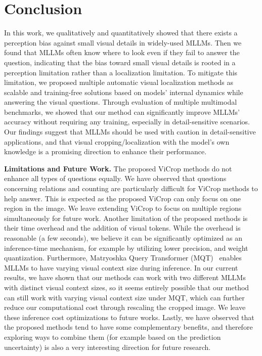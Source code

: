 \section{Conclusion}
In this work, we qualitatively and quantitatively showed that there exists a perception bias against small visual details in widely-used MLLMs. Then we found that MLLMs often know where to look even if they fail to answer the question, indicating that the bias toward small visual details is rooted in a perception limitation rather than a localization limitation. To mitigate this limitation, we proposed multiple automatic visual localization methods as scalable and training-free solutions based on models' internal dynamics while answering the visual questions. Through evaluation of multiple multimodal benchmarks, we showed that our method can significantly improve MLLMs’ accuracy without requiring any training, especially in detail-sensitive scenarios. Our findings suggest that MLLMs should be used with caution in detail-sensitive applications, and that visual cropping/localization with the model's own knowledge is a promising direction to enhance their performance.

\textbf{Limitations and Future Work.}
The proposed ViCrop methods do not enhance all types of questions equally. We have observed that questions concerning relations and counting are particularly difficult for ViCrop methods to help answer. This is expected as the proposed ViCrop can only focus on one region in the image. We leave extending ViCrop to focus on multiple regions simultaneously for future work. Another limitation of the proposed methods is their time overhead and the addition of visual tokens. While the overhead is reasonable (a few seconds), we believe it can be significantly optimized as an inference-time mechanism, for example by utilizing lower precision, and weight quantization. Furthermore,
Matryoshka Query Transformer (MQT)~\citep{matryoshka} enables MLLMs to have varying visual context size during inference. In our current results, we have shown that our methods can work with two different MLLMs with distinct visual context sizes, so it seems entirely possible that our method can still work with varying visual context size under MQT, which can further reduce our computational cost through rescaling the cropped image. We leave these inference cost optimizations to future works. Lastly, we have observed that the proposed methods tend to have some complementary benefits, and therefore exploring ways to combine them (for example based on the prediction uncertainty) is also a very interesting direction for future research.
